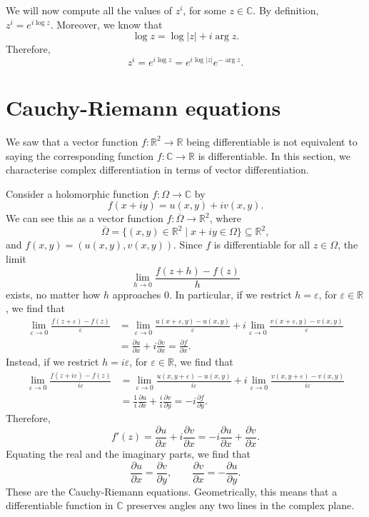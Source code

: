 \documentclass[a4paper, openany]{memoir}
\theoremstyle{definition}
\theoremstyle{plain}
\begin{document}
We will now compute all the values of $z^i$, for some $z \in \mathbb{C}$. By definition, $z^i = e^{i \log z}$. Moreover, we know that
\[\log z = \log |z| + i \arg z.\]
Therefore,
\[z^i = e^{i \log z} = e^{i \log |z|} e^{-\arg z}.\]

\newpage

\section{Cauchy-Riemann equations}
We saw that a vector function $f: \mathbb{R}^2 \to \mathbb{R}$ being differentiable is not equivalent to saying the corresponding function $f: \mathbb{C} \to \mathbb{R}$ is differentiable. In this section, we characterise complex differentiation in terms of vector differentiation. 

Consider a holomorphic function $f: \Omega \to \mathbb{C}$ by
\[f(x + iy) = u(x, y) + iv(x, y).\]
We can see this as a vector function $f: \overline{\Omega} \to \mathbb{R}^2$, where
\[\overline{\Omega} = \{(x, y) \in \mathbb{R}^2 \mid x + iy \in \Omega\} \subseteq \mathbb{R}^2,\]
and $f(x, y) = (u(x, y), v(x, y))$. Since $f$ is differentiable for all $z \in \Omega$, the limit
\[\lim_{h \to 0} \frac{f(z + h) - f(z)}{h}\]
exists, no matter how $h$ approaches $0$. In particular, if we restrict $h = \varepsilon$, for $\varepsilon \in \mathbb{R}$, we find that
\begin{align*}
    \lim_{\varepsilon \to 0} \frac{f(z + \varepsilon) - f(z)}{\varepsilon} &= \lim_{\varepsilon \to 0} \frac{u(x + \varepsilon, y) - u(x, y)}{\varepsilon} + i \lim_{\varepsilon \to 0} \frac{v(x + \varepsilon, y) - v(x, y)}{\varepsilon} \\
    &= \frac{\partial u}{\partial x} + i \frac{\partial v}{\partial x} = \frac{\partial f}{\partial x}.
\end{align*}
Instead, if we restrict $h = i \varepsilon$, for $\varepsilon \in \mathbb{R}$, we find that
\begin{align*}
    \lim_{\varepsilon \to 0} \frac{f(z + i\varepsilon) - f(z)}{i\varepsilon} &= \lim_{\varepsilon \to 0} \frac{u(x, y + \varepsilon) - u(x, y)}{i\varepsilon} + i\lim_{\varepsilon \to 0} \frac{v(x, y + \varepsilon) - v(x, y)}{i \varepsilon} \\
    &= \frac{1}{i} \frac{\partial u}{\partial x} + \frac{i}{i} \frac{\partial v}{\partial y} = -i \frac{\partial f}{\partial y}.
\end{align*}
Therefore,
\[f'(z) = \frac{\partial u}{\partial x} + i \frac{\partial v}{\partial x} = -i \frac{\partial u}{\partial x} + \frac{\partial v}{\partial x}.\]
Equating the real and the imaginary parts, we find that
\[\frac{\partial u}{\partial x} = \frac{\partial v}{\partial y}, \qquad \frac{\partial v}{\partial x} = -\frac{\partial u}{\partial y}.\]
These are the Cauchy-Riemann equations. Geometrically, this means that a differentiable function in $\mathbb{C}$ preserves angles any two lines in the complex plane.
\end{document}
